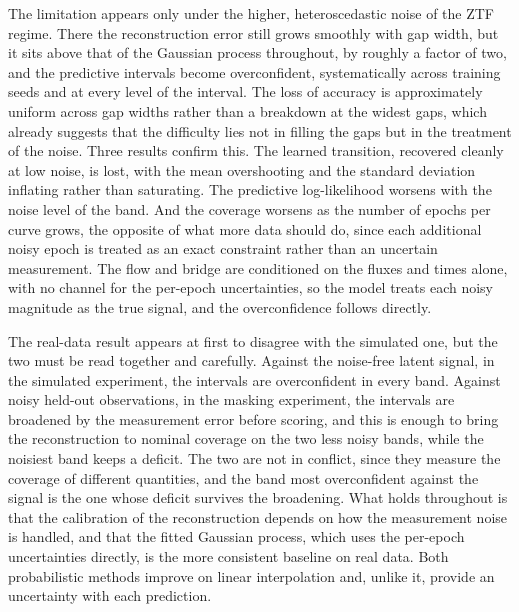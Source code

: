 The limitation appears only under the higher, heteroscedastic noise of the ZTF regime. There the reconstruction error still grows smoothly with gap width, but it sits above that of the Gaussian process throughout, by roughly a factor of two, and the predictive intervals become overconfident, systematically across training seeds and at every level of the interval. The loss of accuracy is approximately uniform across gap widths rather than a breakdown at the widest gaps, which already suggests that the difficulty lies not in filling the gaps but in the treatment of the noise. Three results confirm this. The learned transition, recovered cleanly at low noise, is lost, with the mean overshooting and the standard deviation inflating rather than saturating. The predictive log-likelihood worsens with the noise level of the band. And the coverage worsens as the number of epochs per curve grows, the opposite of what more data should do, since each additional noisy epoch is treated as an exact constraint rather than an uncertain measurement. The flow and bridge are conditioned on the fluxes and times alone, with no channel for the per-epoch uncertainties, so the model treats each noisy magnitude as the true signal, and the overconfidence follows directly.

The real-data result appears at first to disagree with the simulated one, but the two must be read together and carefully. Against the noise-free latent signal, in the simulated experiment, the intervals are overconfident in every band. Against noisy held-out observations, in the masking experiment, the intervals are broadened by the measurement error before scoring, and this is enough to bring the reconstruction to nominal coverage on the two less noisy bands, while the noisiest band keeps a deficit. The two are not in conflict, since they measure the coverage of different quantities, and the band most overconfident against the signal is the one whose deficit survives the broadening. What holds throughout is that the calibration of the reconstruction depends on how the measurement noise is handled, and that the fitted Gaussian process, which uses the per-epoch uncertainties directly, is the more consistent baseline on real data. Both probabilistic methods improve on linear interpolation and, unlike it, provide an uncertainty with each prediction.

